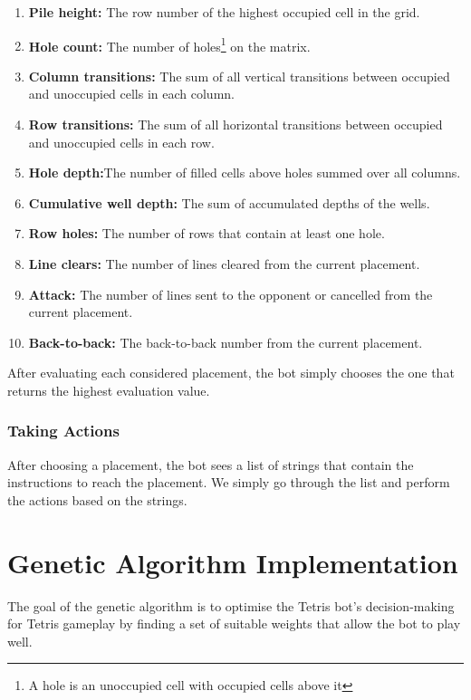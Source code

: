 \documentclass[a4paper, 12pt]{extreport}
\begin{document}
				\begin{enumerate}
					\item \textbf{Pile height:} The row number of the highest occupied cell in the grid.
					\item \textbf{Hole count:} The number of holes\footnote{A hole is an unoccupied cell with occupied cells above it} on the matrix.
					\item \textbf{Column transitions:} The sum of all vertical transitions between occupied and unoccupied cells in each column.
					\item \textbf{Row transitions:} The sum of all horizontal transitions between occupied and unoccupied cells in each row.
					\item \textbf{Hole depth:}The number of filled cells above holes summed over all columns.
					\item \textbf{Cumulative well depth:} The sum of accumulated depths of the wells.
					\item \textbf{Row holes:} The number of rows that contain at least one hole.
					\item \textbf{Line clears:} The number of lines cleared from the current placement.
					\item \textbf{Attack:} The number of lines sent to the opponent or cancelled from the current placement.
					\item \textbf{Back-to-back:} The back-to-back number from the current placement.
				\end{enumerate}
				
				After evaluating each considered placement, the bot simply chooses the one that returns the highest evaluation value.
			
			\subsubsection{Taking Actions}
			
				After choosing a placement, the bot sees a list of strings that contain the instructions to reach the placement. We simply go through the list and perform the actions based on the strings.
				
	\section{Genetic Algorithm Implementation} \label{sec:ga-implementation}
	
		The goal of the genetic algorithm is to optimise the Tetris bot's decision-making for Tetris gameplay by finding a set of suitable weights that allow the bot to play well.
		
\end{document}
